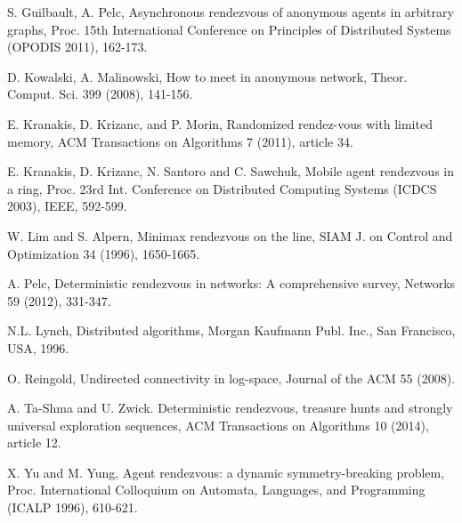 \documentclass [11pt] {article}
\begin{document}
\begin{thebibliography}{99}
S. Guilbault, A. Pelc, Asynchronous rendezvous of anonymous agents in arbitrary graphs,
Proc. 15th International Conference on Principles of Distributed Systems (OPODIS 2011), 162-173.

{
D. Kowalski, A. Malinowski,
How to meet in anonymous network,
Theor. Comput. Sci. 399 (2008), 141-156.}

{
E. Kranakis, D. Krizanc, and P. Morin, 
Randomized rendez-vous with limited memory,
ACM Transactions on Algorithms 7 (2011), article 34}.


E. Kranakis, D. Krizanc, N. Santoro and C. Sawchuk, 
Mobile agent rendezvous in a ring, 
Proc. 23rd Int. Conference on Distributed Computing Systems
(ICDCS 2003), IEEE, 592-599.

W. Lim and S. Alpern,
Minimax rendezvous on the line,
SIAM J. on Control and Optimization 34 (1996), 1650-1665.

A. Pelc, Deterministic rendezvous in networks: A comprehensive survey, Networks 59 (2012), 331-347. 





N.L. Lynch, Distributed algorithms, Morgan Kaufmann Publ. Inc.,
San Francisco, USA, 1996.

O. Reingold, Undirected connectivity in log-space, Journal of the ACM 55 (2008).



{
A. Ta-Shma and U. Zwick.
Deterministic rendezvous, treasure hunts and strongly universal exploration sequences, 
ACM Transactions on Algorithms 10 (2014), article 12.}

X. Yu and M. Yung, 
Agent rendezvous: a dynamic symmetry-breaking problem, 
Proc.  International Colloquium on Automata,
Languages, and Programming (ICALP 1996), 610-621.





\end{thebibliography}
\end{document}
